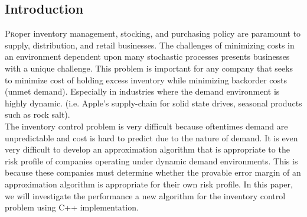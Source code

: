 \documentclass[twoside]{article}
\begin{document}
\begin{multicols}{2} %

\section{Introduction}

\lettrine[nindent=0em,lines=2]{P}roper inventory management, stocking, and purchasing policy are paramount to supply, distribution, and retail businesses. The challenges of minimizing costs in an environment dependent upon many stochastic processes presents businesses with a unique challenge. This problem is important for any company that seeks to minimize cost of holding excess inventory while minimizing backorder costs (unmet demand). Especially in industries where the demand environment is highly dynamic. (i.e. Apple's supply-chain for solid state drives, seasonal products such as rock salt). \\
The inventory control problem is very difficult because oftentimes demand are unpredictable and cost is hard to predict due to the nature of demand. It is even very difficult to develop an approximation algorithm that is appropriate to the risk profile of companies operating under dynamic demand environments. This is because these companies must determine whether the provable error margin of an approximation algorithm is appropriate for their own risk profile. In this paper, we will investigate the performance a new algorithm\cite{CLAcha2} for the inventory control problem using C++ implementation.\\



\end{multicols}
\end{document}
